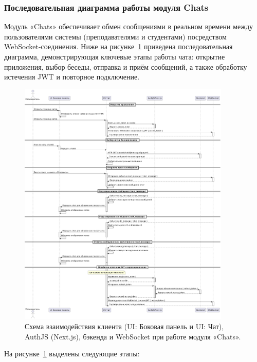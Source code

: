 \subsubsection{Последовательная диаграмма работы модуля Chats}
Модуль «Chats» обеспечивает обмен сообщениями в реальном времени между пользователями системы (преподавателями и студентами) посредством WebSocket-соединения. Ниже на рисунке~\ref{fig:chats-flow} приведена последовательная диаграмма, демонстрирующая ключевые этапы работы чата: открытие приложения, выбор беседы, отправка и приём сообщений, а также обработку истечения JWT и повторное подключение.

\begin{figure}[H]
    \centering
    \includegraphics[width=0.9\textwidth]{static/diagrams/Chats.png}
    \caption{Схема взаимодействия клиента (UI: Боковая панель и UI: Чат), AuthJS (Next.js), бэкенда и WebSocket при работе модуля «Chats».}
    \label{fig:chats-flow}
\end{figure}

На рисунке~\ref{fig:chats-flow} выделены следующие этапы:


